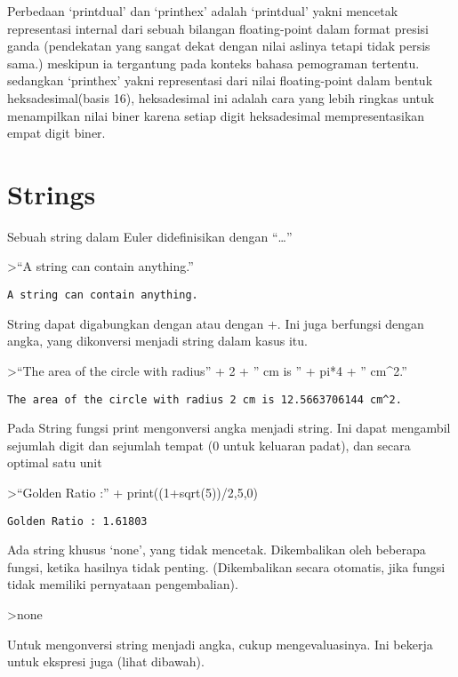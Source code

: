\documentclass[
]{book}
\begin{document}
Perbedaan `printdual' dan `printhex' adalah `printdual' yakni mencetak representasi internal dari sebuah bilangan floating-point dalam format presisi ganda (pendekatan yang sangat dekat dengan nilai aslinya tetapi tidak persis sama.) meskipun ia tergantung pada konteks bahasa pemograman tertentu. sedangkan `printhex' yakni representasi dari nilai floating-point dalam bentuk heksadesimal(basis 16), heksadesimal ini adalah cara yang lebih ringkas untuk menampilkan nilai biner karena setiap digit heksadesimal mempresentasikan empat digit biner.

\section{Strings}\label{strings}

Sebuah string dalam Euler didefinisikan dengan ``\ldots{}''

\textgreater{}``A string can contain anything.''

\begin{verbatim}
A string can contain anything.
\end{verbatim}

String dapat digabungkan dengan \textbar{} atau dengan +. Ini juga berfungsi dengan angka, yang dikonversi menjadi string dalam kasus itu.

\textgreater{}``The area of the circle with radius'' + 2 + '' cm is '' + pi*4 + '' cm\^{}2.''

\begin{verbatim}
The area of the circle with radius 2 cm is 12.5663706144 cm^2.
\end{verbatim}

Pada String fungsi print mengonversi angka menjadi string. Ini dapat mengambil sejumlah digit dan sejumlah tempat (0 untuk keluaran padat), dan secara optimal satu unit

\textgreater{}``Golden Ratio :'' + print((1+sqrt(5))/2,5,0)

\begin{verbatim}
Golden Ratio : 1.61803
\end{verbatim}

Ada string khusus `none', yang tidak mencetak. Dikembalikan oleh beberapa fungsi, ketika hasilnya tidak penting. (Dikembalikan secara otomatis, jika fungsi tidak memiliki pernyataan pengembalian).

\textgreater none

Untuk mengonversi string menjadi angka, cukup mengevaluasinya. Ini bekerja untuk ekspresi juga (lihat dibawah).
\end{document}
